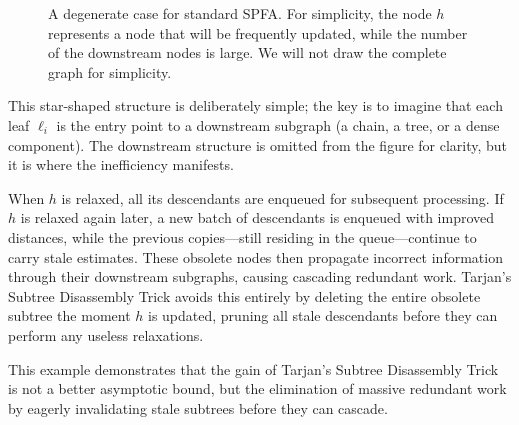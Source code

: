 \documentclass[a4paper]{article}
\theoremstyle{definition}
\begin{document}
\begin{figure}[H]
\centering
{}
\caption{A degenerate case for standard SPFA. For simplicity, the node $h$ represents a node that will be frequently updated, while the number of the downstream nodes is large. We will not draw the complete graph for simplicity.}
\label{fig:degenerate-case}
\end{figure}

This star-shaped structure is deliberately simple; the key is to imagine that each leaf $\ell_i$ is the entry point to a downstream subgraph (a chain, a tree, or a dense component). The downstream structure is omitted from the figure for clarity, but it is where the inefficiency manifests.

When $h$ is relaxed, all its descendants are enqueued for subsequent processing. If $h$ is relaxed again later, a new batch of descendants is enqueued with improved distances, while the previous copies---still residing in the queue---continue to carry stale estimates. These obsolete nodes then propagate incorrect information through their downstream subgraphs, causing cascading redundant work. Tarjan's Subtree Disassembly Trick avoids this entirely by deleting the entire obsolete subtree the moment $h$ is updated, pruning all stale descendants before they can perform any useless relaxations.

This example demonstrates that the gain of Tarjan's Subtree Disassembly Trick is not a better asymptotic bound, but the elimination of massive redundant work by eagerly invalidating stale subtrees before they can cascade. 
\end{document}
